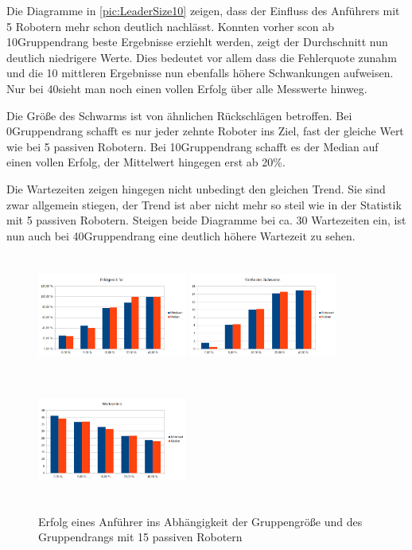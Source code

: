 Die Diagramme in \autoref{pic:LeaderSize10} zeigen, dass der Einfluss des Anführers mit 5 Robotern mehr schon deutlich nachlässt. Konnten vorher scon ab 10\per Gruppendrang beste Ergebnisse erziehlt werden, zeigt der Durchschnitt nun deutlich niedrigere Werte. Dies bedeutet vor allem dass die Fehlerquote zunahm und die 10 mittleren Ergebnisse nun ebenfalls höhere Schwankungen aufweisen. Nur bei 40\per sieht man noch einen vollen Erfolg über alle Messwerte hinweg.

Die Größe des Schwarms ist von ähnlichen Rückschlägen betroffen. Bei 0\per Gruppendrang schafft es nur jeder zehnte Roboter ins Ziel, fast der gleiche Wert wie bei 5 passiven Robotern. Bei 10\per Gruppendrang schafft es der Median auf einen vollen Erfolg, der Mittelwert hingegen erst ab 20\%.

Die Wartezeiten zeigen hingegen nicht unbedingt den gleichen Trend. Sie sind zwar allgemein stiegen, der Trend ist aber nicht mehr so steil wie in der Statistik mit 5 passiven Robotern. Steigen beide Diagramme bei ca. 30 Wartezeiten ein, ist nun auch bei 40\per Gruppendrang eine deutlich höhere Wartezeit zu sehen.

\begin{figure}
	\includegraphics[width=4.9cm, height=4cm]{graphics/Statistics/Leader/FlockSize/15_1.png}
	\includegraphics[width=4.9cm, height=4cm]{graphics/Statistics/Leader/FlockSize/15_2.png}
	\includegraphics[width=4.9cm, height=4cm]{graphics/Statistics/Leader/FlockSize/15_3.png}
	\caption{Erfolg eines Anführer ins Abhängigkeit der Gruppengröße und des Gruppendrangs mit 15 passiven Robotern}
	\label{pic:LeaderSize15}
\end{figure}

